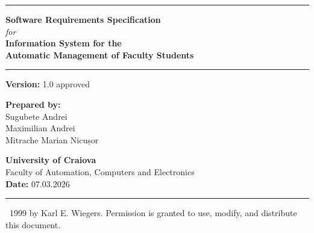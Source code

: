 \documentclass[11pt, a4paper]{article}
\begin{document}
\begin{titlepage}
    \begin{center}
        \vspace*{1cm}
        
        \textcolor{PrimaryColor}{\rule{\textwidth}{1.5pt}}\vspace{0.5cm}
        
        {\Huge \bfseries \textcolor{PrimaryColor}{Software Requirements Specification}} \\[0.5cm]
        {\Large \textit{for}} \\[0.5cm]
        {\LARGE \bfseries Information System for the} \\
        {\LARGE \bfseries Automatic Management of Faculty Students}
        
        \vspace{0.5cm}\textcolor{PrimaryColor}{\rule{\textwidth}{1.5pt}}
        
        \vspace{1.5cm}
        {\Large \textbf{Version:} 1.0 approved}
        
        \vfill
        
        \begin{flushleft}
            {\Large \textbf{Prepared by:}} \\[0.3cm]
            {\large Sugubete Andrei} \\
            {\large Maximilian Andrei} \\
            {\large Mitrache Marian Nicușor}
        \end{flushleft}
        
        \vspace{1.5cm}
        
        \begin{flushright}
            {\Large \textbf{University of Craiova}} \\[0.2cm]
            {\large Faculty of Automation, Computers and Electronics} \\[0.2cm]
            {\large \textbf{Date:} 07.03.2026}
        \end{flushright}
        
        \vspace{2cm}
        \rule{\textwidth}{0.5pt}\vspace{0.2cm}
        
        \footnotesize \textcopyright\ 1999 by Karl E. Wiegers. Permission is granted to use, modify, and distribute this document.
    \end{center}
\end{titlepage}
\end{document}
